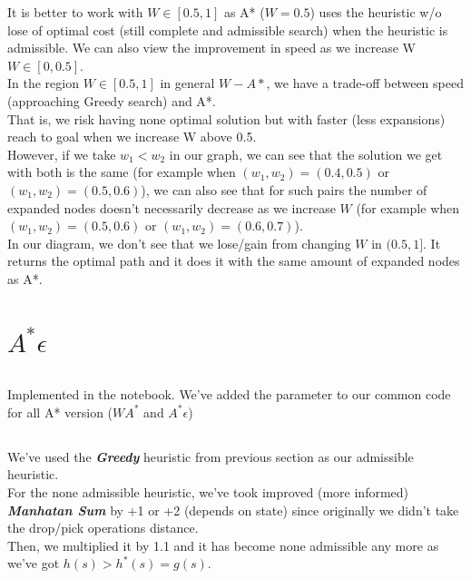 \documentclass[12pt]{article}
\begin{document}
It is better to work with $W\in[0.5,1]$ as A* ($W=0.5$) uses the heuristic w/o lose of optimal cost (still complete and admissible search) when the heuristic is admissible. We can also view the improvement in speed as we increase W $W\in[0,0.5]$.\\

In the region $W\in[0.5,1]$ in general $W-A*$, we have a trade-off between speed (approaching Greedy search) and A*.\\ That is, we risk having none optimal solution but with faster (less expansions) reach to goal when we increase W above 0.5.\\

However, if we take $w_1<w_2$ in our graph, we can see that the solution we get with both is the same (for example when $(w_1,w_2)=(0.4,0.5)$ or $(w_1,w_2)=(0.5,0.6)$), we can also see that for such pairs the number of expanded nodes doesn't necessarily decrease as we increase $W$ (for example when $(w_1,w_2)=(0.5,0.6)$ or $(w_1,w_2)=(0.6,0.7)$).\\

In our diagram, we don't see that we lose/gain from changing $W$ in $(0.5,1]$. It returns the optimal path and it does it with the same amount of expanded nodes as A*.

\section{$A^*\epsilon$}
\subsection{}
Implemented in the notebook. We've added the parameter to our common code for all A* version ($WA^*$ and $A^*\epsilon$)

\subsection{}
We've used the {\textit{\textbf{Greedy}}} heuristic from previous section as our admissible heuristic.\\
For the none admissible heuristic, we've took improved (more informed) {\textit{\textbf{Manhatan Sum}}} by +1 or +2 (depends on state) since originally we didn't take the drop/pick operations distance.\\
Then, we multiplied it by 1.1 and it has become none admissible any more as we've got  $h(s) > h^*(s) = g(s)$.

\subsection{}
\end{document}
